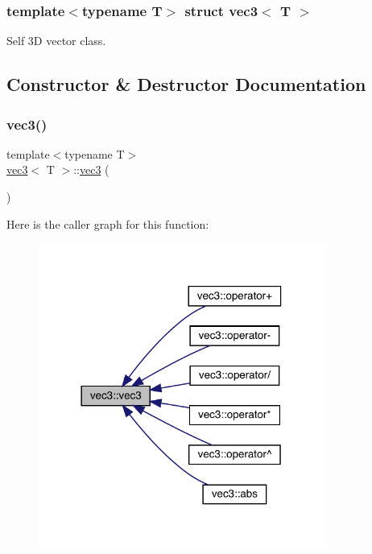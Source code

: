 \subsubsection*{template$<$typename T$>$\newline
struct vec3$<$ T $>$}

Self 3D vector class. 

\subsection{Constructor \& Destructor Documentation}
\mbox{\label{structvec3_afb7342872bc442bf0da6a7da1671e77e}} 
\subsubsection{\texorpdfstring{vec3()}{vec3()}\hspace{0.1cm}{\footnotesize\ttfamily [1/3]}}
{\footnotesize\ttfamily template$<$typename T$>$ \\
\mbox{\hyperlink{structvec3}{vec3}}$<$ T $>$\+::\mbox{\hyperlink{structvec3}{vec3}} (\begin{DoxyParamCaption}{ }\end{DoxyParamCaption})\hspace{0.3cm}{\ttfamily [inline]}}

Here is the caller graph for this function\+:\nopagebreak
\begin{figure}[H]
\begin{center}
\leavevmode
\includegraphics[width=266pt]{structvec3_afb7342872bc442bf0da6a7da1671e77e_icgraph}
\end{center}
\end{figure}
\mbox{\label{structvec3_a9cdcc79d7383d2676ae1f5701c481607}} 
